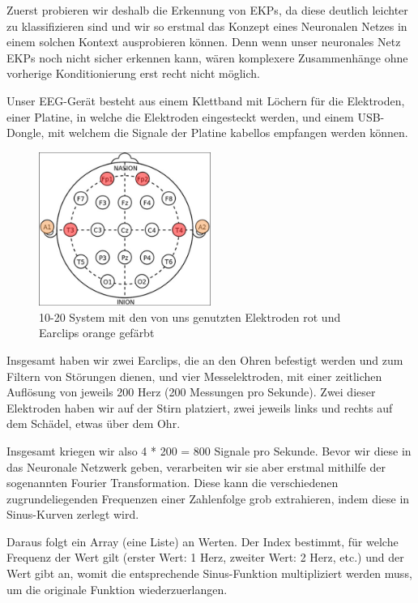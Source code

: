 \documentclass{scrartcl}
\begin{document}
	Zuerst probieren wir deshalb die Erkennung von EKPs, da diese deutlich leichter zu klassifizieren sind und wir so erstmal das Konzept eines Neuronalen Netzes in einem solchen Kontext ausprobieren können. Denn wenn unser neuronales Netz EKPs noch nicht sicher erkennen kann, wären komplexere Zusammenhänge ohne vorherige Konditionierung erst recht nicht möglich.

	Unser EEG-Gerät besteht aus einem Klettband mit Löchern für die Elektroden, einer Platine, in welche die Elektroden eingesteckt werden, und einem USB-Dongle, mit welchem die Signale der Platine kabellos empfangen werden können.

	\begin{figure}
		\centering
		\includegraphics[width=0.5\textwidth]{pictures/elektroden-platzierungen.png}
		\caption{10-20 System mit den von uns genutzten Elektroden rot und Earclips orange gefärbt}
	\end{figure}

	Insgesamt haben wir zwei Earclips, die an den Ohren befestigt werden und zum Filtern von Störungen dienen, und vier Messelektroden, mit einer zeitlichen Auflösung von jeweils 200 Herz (200 Messungen pro Sekunde). Zwei dieser Elektroden haben wir auf der Stirn platziert, zwei jeweils links und rechts auf dem Schädel, etwas über dem Ohr.


	Insgesamt kriegen wir also 4 * 200 = 800 Signale pro Sekunde. Bevor wir diese in das Neuronale Netzwerk geben, verarbeiten wir sie aber erstmal mithilfe der sogenannten Fourier Transformation. Diese kann die verschiedenen zugrundeliegenden Frequenzen einer Zahlenfolge grob extrahieren, indem diese in Sinus-Kurven zerlegt wird.

	Daraus folgt ein Array (eine Liste) an Werten. Der Index bestimmt, für welche Frequenz der Wert gilt (erster Wert: 1 Herz, zweiter Wert: 2 Herz, etc.) und der Wert gibt an, womit die entsprechende Sinus-Funktion multipliziert werden muss, um die originale Funktion wiederzuerlangen. 
\end{document}
